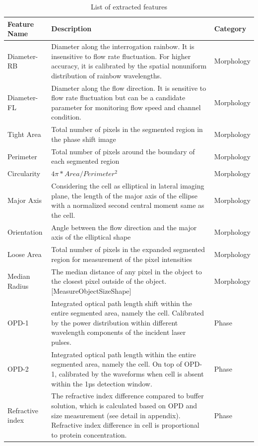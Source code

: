 \documentclass[aps,pra,reprint,superscriptaddress]{revtex4-1}
\begin{document}
\begin{table}[H]
\caption{\label{tbl:Features} List of extracted features}
\begin{tabular}{|p{}|p{}|p{}|}
\hline
Feature Name	 &Description	 &Category\\ \hline
Diameter-RB	 &Diameter along the interrogation rainbow. It is insensitive to flow rate fluctuation. For higher accuracy, it is calibrated by the spatial nonuniform distribution of rainbow wavelengths. 	 &Morphology\\ \hline
Diameter-FL	 &Diameter along the flow direction. It is sensitive to flow rate fluctuation but can be a candidate parameter for monitoring flow speed and channel condition.	 &Morphology\\ \hline
Tight Area	 &Total number of pixels in the segmented region in the phase shift image	 &Morphology\\ \hline
Perimeter	 &Total number of pixels around the boundary of each segmented region	 &Morphology\\ \hline
Circularity	 &${4π*Area/Perimeter^2}$  &Morphology\\ \hline
Major Axis 	 &Considering the cell as elliptical in lateral imaging plane, the length of the major axis of the ellipse with a normalized second central moment same as the cell.	 &Morphology\\ \hline
Orientation	 &Angle between the flow direction and the major axis of the elliptical shape	 &Morphology\\ \hline
Loose Area	 &Total number of pixels in the expanded segmented region for measurement of the pixel intensities	 &Morphology\\ \hline
Median Radius	 &The median distance of any pixel in the object to the closest pixel outside of the object. [MeasureObjectSizeShape]	 &Morphology\\ \hline
OPD-1	 &Integrated optical path length shift within the entire segmented area, namely the cell. Calibrated by the power distribution within different wavelength components of the incident laser pulses.	 &Phase\\ \hline
OPD-2	 &Integrated optical path length within the entire segmented area, namely the cell. On top of OPD-1, calibrated by the waveforms when cell is absent within the 1µs detection window.	 &Phase\\ \hline
Refractive index	 &The refractive index difference compared to buffer solution, which is calculated based on OPD and size measurement (see detail in appendix). Refractive index difference in cell is proportional to protein concentration.	 &Phase\\ \hline

\end{tabular}
\end{table}
\end{document}
